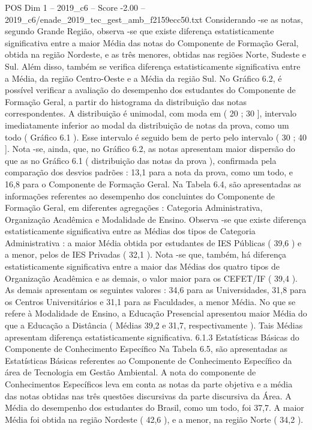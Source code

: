 \begin{textsample}{POS Dim 1 – 2019\_c6 – Score -2.00 – 2019\_c6/enade\_2019\_tec\_gest\_amb\_f2159ecc50.txt}
Considerando -se as notas, segundo Grande Região, observa -se que existe diferença estatisticamente significativa entre a maior Média das notas do Componente de Formação Geral, obtida na região Nordeste, e as três menores, obtidas nas regiões Norte, Sudeste e Sul.
Além disso, também se verifica diferença estatisticamente significativa entre a Média, da região Centro-Oeste e a Média da região Sul.
No Gráfico 6.2, é possível verificar a avaliação do desempenho dos estudantes do Componente de Formação Geral, a partir do histograma da distribuição das notas correspondentes.
A distribuição é unimodal, com moda em ( 20 ; 30 ], intervalo imediatamente inferior ao modal da distribuição de notas da prova, como um todo ( Gráfico 6.1 ).
Esse intervalo é seguido bem de perto pelo intervalo ( 30 ; 40 ].
Nota -se, ainda, que, no Gráfico 6.2, as notas apresentam maior dispersão do que as no Gráfico 6.1 ( distribuição das notas da prova ), confirmada pela comparação dos desvios padrões : 13,1 para a nota da prova, como um todo, e 16,8 para o Componente de Formação Geral.
Na Tabela 6.4, são apresentadas as informações referentes ao desempenho dos concluintes do Componente de Formação Geral, em diferentes agregações : Categoria Administrativa, Organização Acadêmica e Modalidade de Ensino.
Observa -se que existe diferença estatisticamente significativa entre as Médias dos tipos de Categoria Administrativa : a maior Média obtida por estudantes de IES Públicas ( 39,6 ) e a menor, pelos de IES Privadas ( 32,1 ).
Nota -se que, também, há diferença estatisticamente significativa entre a maior das Médias dos quatro tipos de Organização Acadêmica e as demais, o valor maior para os CEFET/IF ( 39,4 ).
As demais apresentam os seguintes valores : 34,6 para as Universidades, 31,8 para os Centros Universitários e 31,1 para as Faculdades, a menor Média.
No que se refere à Modalidade de Ensino, a Educação Presencial apresentou maior Média do que a Educação a Distância ( Médias 39,2 e 31,7, respectivamente ).
Tais Médias apresentam diferença estatisticamente significativa. 6.1.3 Estatísticas Básicas do Componente de Conhecimento Específico Na Tabela 6.5, são apresentadas as Estatísticas Básicas referentes ao Componente de Conhecimento Específico da área de Tecnologia em Gestão Ambiental.
A nota do componente de Conhecimentos Específicos leva em conta as notas da parte objetiva e a média das notas obtidas nas três questões discursivas da parte discursiva da Área.
A Média do desempenho dos estudantes do Brasil, como um todo, foi 37,7.
A maior Média foi obtida na região Nordeste ( 42,6 ), e a menor, na região Norte ( 34,2 ).

\end{textsample}
